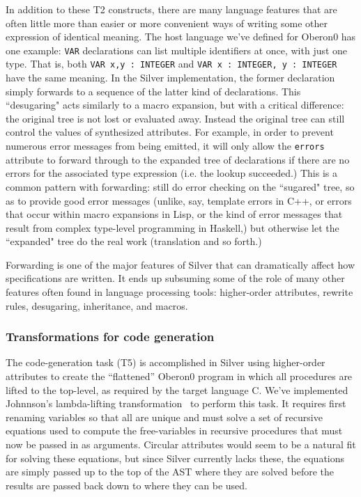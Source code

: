In addition to these T2 constructs, 
there are many language features that are often little more than easier or
more convenient ways of writing some other expression of identical meaning.
%
The host language we've defined for Oberon0 has one example: \texttt{VAR}
declarations can list multiple identifiers at once, with just one type.
%
That is, both \texttt{VAR x,y : INTEGER} and 
\texttt{VAR x : INTEGER, y : INTEGER} have the same meaning.
%
In the Silver implementation, the former declaration simply forwards to a sequence
of the latter kind of declarations.
%
This ``desugaring" acts similarly to a macro expansion, but with a critical
difference: the original tree is not lost or evaluated away.
%
Instead the original tree can still control the values of synthesized attributes.
%
For example, in order to prevent numerous error messages from being emitted,
it will only allow the \texttt{errors} attribute to forward through to the
expanded tree of declarations if there are no errors for the associated
type expression (i.e. the lookup succeeded.)
%
This is a common pattern with forwarding: still do error checking on the
``sugared" tree, so as to provide good error messages (unlike, say, template
errors in C++, or errors that occur within macro expansions in Lisp, or
the kind of error messages that result from complex type-level programming
in Haskell,) but otherwise let the ``expanded" tree do the real work (translation
and so forth.)

Forwarding is one of the major features of Silver that can dramatically
affect how specifications are written.
%
It ends up subsuming some of the role of many other features often found in
language processing tools: higher-order attributes, rewrite rules, desugaring,
inheritance, and macros. %

\subsubsection{Transformations for code generation}


The code-generation task (T5) is accomplished in Silver using
higher-order attributes to create the ``flattened'' Oberon0 program in
which all procedures are lifted to the top-level, as required by the
target language C.  We've implemented Johnnson's lambda-lifting
transformation~\cite{Johnsson85} to perform this task.
It requires first renaming variables so that all are unique and must
solve a set of recursive equations used to compute the
free-variables in recursive procedures that must now be passed in as
arguments.  Circular attributes would seem to be a natural fit for
solving these equations, but since Silver currently lacks these, the
equations are simply passed up to the top of the AST where they are
solved before the results are passed back down to where they can be
used.

